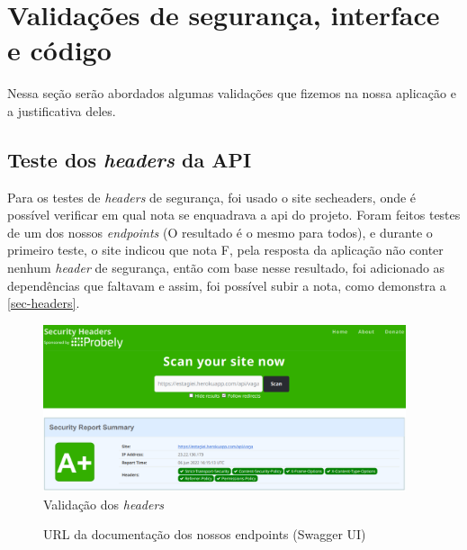 \section{Validações de segurança, interface e código}
Nessa seção serão abordados algumas validações que fizemos na nossa aplicação e a justificativa deles.

\subsection{Teste dos \emph{headers} da API}
Para os testes de \emph{headers} de segurança, foi usado o site \gls{secheaders}, onde é possível verificar em qual nota se enquadrava a \ac{api} do projeto. Foram feitos testes de um dos nossos \emph{endpoints} (O resultado é o mesmo para todos), e durante o primeiro teste, o site indicou que nota F, pela resposta da aplicação não conter nenhum \emph{header} de segurança, então com base nesse resultado, foi adicionado as dependências que faltavam e assim, foi possível subir a nota, como demonstra a \autoref{sec-headers}.

\begin{figure}[H]
	\centering
	\caption{\label{sec-headers}Validação dos \emph{headers}}
	\includegraphics[width=0.95\textwidth]{../imagens/web-tests/grade-security-headers.png}
\end{figure}

\begin{figure}[htb]
	\caption{\label{qr-url-swagger}URL da documentação dos nossos endpoints (Swagger UI)}
	\begin{center}
	\end{center}
\end{figure}

